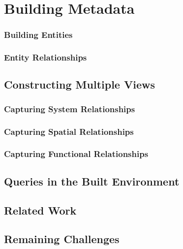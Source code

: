 









\chapter{Building Metadata}
\subsection{Building Entities}
\subsection{Entity Relationships}

\section{Constructing Multiple Views}
\subsection{Capturing System Relationships}
\subsection{Capturing Spatial Relationships}
\subsection{Capturing Functional Relationships}

\section{Queries in the Built Environment}

\section{Related Work}

\section{Remaining Challenges}

